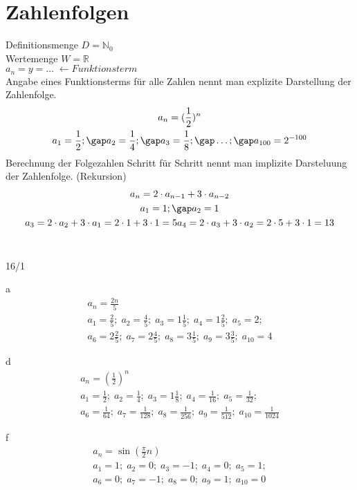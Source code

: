 \section{Zahlenfolgen}
Definitionsmenge $D = \mathbb{N}_0$ \\
Wertemenge $W = \mathbb{R}$ \\
$a_n = y = \dots \;\leftarrow Funktionsterm$ \\
Angabe eines Funktionsterms für alle Zahlen nennt man explizite Darstellung der Zahlenfolge. \\
\begin{gather*}
  a_n = (\frac{1}{2})^n \\
  a_1 = \frac{1}{2};\gap a_2 = \frac{1}{4};\gap a_3 = \frac{1}{8}; \gap\dots;\gap a_{100} = 2^{-100}
\end{gather*}
Berechnung der Folgezahlen Schritt für Schritt nennt man implizite Darsteluung der Zahlenfolge. (Rekursion) \\
\begin{gather*}
  a_n = 2 \cdot a_{n-1} + 3 \cdot a_{n-2} \\
  a_1 = 1;\gap a_2 = 1 \\
  a_3 = 2 \cdot a_2 + 3 \cdot a_1 = 2 \cdot 1 + 3 \cdot 1 = 5
  a_4 = 2 \cdot a_3 + 3 \cdot a_2 = 2 \cdot 5 + 3 \cdot 1 = 13
\end{gather*} \\
\begin{exercise}{16/1}
  \item [a]
  \begin{gather*}
    a_n = \frac{2n}{5} \\
    a_1 = \frac{2}{5};\; a_2 = \frac{4}{5};\; a_3 = 1\frac{1}{5};\; a_4 = 1\frac{2}{5};\; a_5 = 2;\\
    a_6 = 2\frac{2}{5};\; a_7 = 2\frac{4}{5};\; a_8 = 3\frac{1}{5};\; a_9 = 3\frac{3}{5};\; a_{10} = 4
  \end{gather*}
  \item [d]
  \begin{gather*}
    a_n = (\frac{1}{2})^n \\
    a_1 = \frac{1}{2};\; a_2 = \frac{1}{4};\; a_3 = 1\frac{1}{8};\; a_4 = \frac{1}{16};\; a_5 = \frac{1}{32};\\
    a_6 = \frac{1}{64};\; a_7 = \frac{1}{128};\; a_8 = \frac{1}{256};\; a_9 = \frac{1}{512};\; a_{10} = \frac{1}{1024}
  \end{gather*}
  \item [f]
  \begin{gather*}
    a_n = \sin(\frac{\pi}{2}n) \\
    a_1 = 1;\; a_2 = 0;\; a_3 = -1;\; a_4 = 0;\; a_5 = 1;\\
    a_6 = 0;\; a_7 = -1;\; a_8 = 0;\; a_9 = 1;\; a_{10} = 0
  \end{gather*}
\end{exercise}
